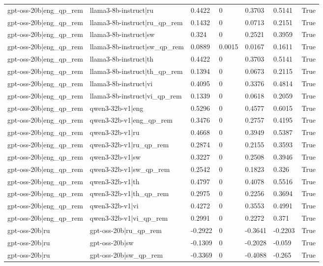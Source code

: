 \begin{table}
\begin{tabular}{llllllr}
gpt-oss-20b|eng_qp_rem & llama3-8b-instruct|ru & 0.4422 & 0 & 0.3703 & 0.5141 & True \\
gpt-oss-20b|eng_qp_rem & llama3-8b-instruct|ru_qp_rem & 0.1432 & 0 & 0.0713 & 0.2151 & True \\
gpt-oss-20b|eng_qp_rem & llama3-8b-instruct|sw & 0.324 & 0 & 0.2521 & 0.3959 & True \\
gpt-oss-20b|eng_qp_rem & llama3-8b-instruct|sw_qp_rem & 0.0889 & 0.0015 & 0.0167 & 0.1611 & True \\
gpt-oss-20b|eng_qp_rem & llama3-8b-instruct|th & 0.4422 & 0 & 0.3703 & 0.5141 & True \\
gpt-oss-20b|eng_qp_rem & llama3-8b-instruct|th_qp_rem & 0.1394 & 0 & 0.0673 & 0.2115 & True \\
gpt-oss-20b|eng_qp_rem & llama3-8b-instruct|vi & 0.4095 & 0 & 0.3376 & 0.4814 & True \\
gpt-oss-20b|eng_qp_rem & llama3-8b-instruct|vi_qp_rem & 0.1339 & 0 & 0.0618 & 0.2059 & True \\
gpt-oss-20b|eng_qp_rem & qwen3-32b-v1|eng & 0.5296 & 0 & 0.4577 & 0.6015 & True \\
gpt-oss-20b|eng_qp_rem & qwen3-32b-v1|eng_qp_rem & 0.3476 & 0 & 0.2757 & 0.4195 & True \\
gpt-oss-20b|eng_qp_rem & qwen3-32b-v1|ru & 0.4668 & 0 & 0.3949 & 0.5387 & True \\
gpt-oss-20b|eng_qp_rem & qwen3-32b-v1|ru_qp_rem & 0.2874 & 0 & 0.2155 & 0.3593 & True \\
gpt-oss-20b|eng_qp_rem & qwen3-32b-v1|sw & 0.3227 & 0 & 0.2508 & 0.3946 & True \\
gpt-oss-20b|eng_qp_rem & qwen3-32b-v1|sw_qp_rem & 0.2542 & 0 & 0.1823 & 0.326 & True \\
gpt-oss-20b|eng_qp_rem & qwen3-32b-v1|th & 0.4797 & 0 & 0.4078 & 0.5516 & True \\
gpt-oss-20b|eng_qp_rem & qwen3-32b-v1|th_qp_rem & 0.2975 & 0 & 0.2256 & 0.3694 & True \\
gpt-oss-20b|eng_qp_rem & qwen3-32b-v1|vi & 0.4272 & 0 & 0.3553 & 0.4991 & True \\
gpt-oss-20b|eng_qp_rem & qwen3-32b-v1|vi_qp_rem & 0.2991 & 0 & 0.2272 & 0.371 & True \\
gpt-oss-20b|ru & gpt-oss-20b|ru_qp_rem & -0.2922 & 0 & -0.3641 & -0.2203 & True \\
gpt-oss-20b|ru & gpt-oss-20b|sw & -0.1309 & 0 & -0.2028 & -0.059 & True \\
gpt-oss-20b|ru & gpt-oss-20b|sw_qp_rem & -0.3369 & 0 & -0.4088 & -0.265 & True \\

\end{tabular}
\end{table}
